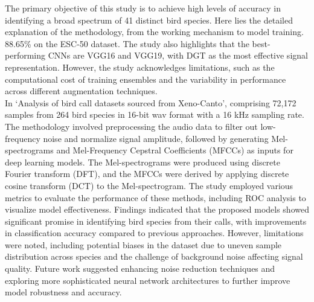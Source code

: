 The primary objective of this study is to achieve high levels of accuracy in
identifying a broad spectrum of 41 distinct bird species. Here lies the
detailed explanation of the methodology, from the working mechanism to model
training. 88.65\% on the ESC-50 dataset. The study also highlights that the
best-performing CNNs are VGG16 and VGG19, with DGT as the most effective signal
representation. However, the study acknowledges limitations, such as the
computational cost of training ensembles and the variability in performance
across different augmentation techniques.\\

In\cite{wang2022efficient} `Analysis of bird call datasets sourced from
Xeno-Canto', comprising 72,172 samples from 264 bird species in 16-bit wav
format with a 16 kHz sampling rate. The methodology involved preprocessing the
audio data to filter out low-frequency noise and normalize signal amplitude,
followed by generating Mel-spectrograms and Mel-Frequency Cepstral Coefficients
(MFCCs) as inputs for deep learning models. The Mel-spectrograms were produced
using discrete Fourier transform (DFT), and the MFCCs were derived by applying
discrete cosine transform (DCT) to the Mel-spectrogram. The study employed
various metrics to evaluate the performance of these methods, including ROC
analysis to visualize model effectiveness. Findings indicated that the proposed
models showed significant promise in identifying bird species from their calls,
with improvements in classification accuracy compared to previous approaches.
However, limitations were noted, including potential biases in the dataset due
to uneven sample distribution across species and the challenge of background
noise affecting signal quality. Future work suggested enhancing noise reduction
techniques and exploring more sophisticated neural network architectures to
further improve model robustness and accuracy.\\


